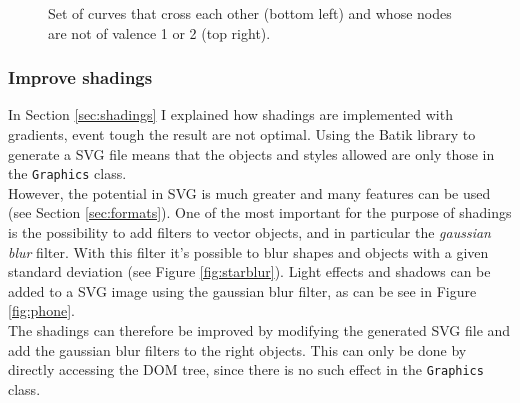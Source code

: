 \documentclass[]{usiinfbachelorproject}
\begin{document}
\begin{figure}[ht]
	\centering
	\caption{Set of curves that cross each other (bottom left) and whose nodes are not of valence 1 or 2 (top right).}
	\label{fig:testcurve}
\end{figure}

\subsubsection{Improve shadings}

In Section \ref{sec:shadings} I explained how shadings are implemented with gradients, event tough the result are not optimal. Using the Batik library to generate a SVG file means that the objects and styles allowed are only those in the {\tt Graphics} class.\\
However, the potential in SVG is much greater and many features can be used (see Section \ref{sec:formats}). One of the most important for the purpose of shadings is the possibility to add filters to vector objects, and in particular the \emph{gaussian blur} filter. With this filter it's possible to blur shapes and objects with a given standard deviation (see Figure \ref{fig:starblur}). Light effects and shadows can be added to a SVG image using the gaussian blur filter, as can be see in Figure \ref{fig:phone}.\\
The shadings can therefore be improved by modifying the generated SVG file and add the gaussian blur filters to the right objects. This can only be done by directly accessing the DOM tree, since there is no such effect in the {\tt Graphics} class.
\end{document}
